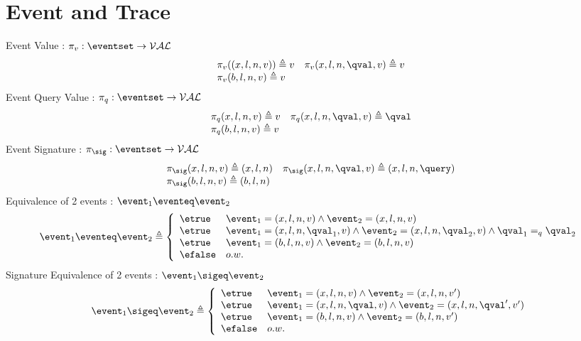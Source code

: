 \clearpage
%
\section{Event and Trace}
%
%
%
Event Value : $\pi_v : \eventset \to \mathcal{VAL}$
\[
\begin{array}{ll}
\pi_v((x, l, n, v)) \triangleq v
&
\pi_v (x, l, n, \qval, v) \triangleq v
\\
\pi_v (b, l, n, v)  \triangleq v
&
\end{array}
\]
%
Event Query Value : $\pi_{q} : \eventset \to \mathcal{VAL}$
\[
\begin{array}{ll}
\pi_{q} (x, l, n, v) \triangleq v
&
\pi_{q} (x, l, n, \qval, v) \triangleq \qval
\\
\pi_{q} (b, l, n, v)  \triangleq v
&
\end{array}
\]%
% 
Event Signature : $\pi_{\sig} : \eventset \to \mathcal{VAL}$
\[
\begin{array}{ll}
\pi_{\sig} (x, l, n, v) \triangleq (x, l, n)
&
\pi_{\sig} (x, l, n, \qval, v) \triangleq (x, l, n, \query)
\\
\pi_{\sig} (b, l, n, v)  \triangleq (b, l, n)
&
\end{array}
\]
%
Equivalence of 2 events : $\event_1 \eventeq \event_2$
\[
\event_1 \eventeq \event_2 \triangleq
\left\{
\begin{array}{ll}
\etrue & \event_1 = (x, l, n, v) \land \event_2 = (x, l, n, v) \\
\etrue & \event_1 = (x, l, n, \qval_1, v) \land \event_2 = (x, l, n, \qval_2, v)  
\land \qval_1 =_{q} \qval_2\\
\etrue & \event_1 = (b, l, n, v) \land \event_2 = (b, l, n, v) \\
\efalse & o.w.
\end{array}
\right.
\]
%
Signature Equivalence of 2 events : $\event_1 \sigeq \event_2$
\[
\event_1 \sigeq \event_2 \triangleq
\left\{
\begin{array}{ll}
\etrue & \event_1 = (x, l, n, v) \land \event_2 = (x, l, n, v') \\
\etrue & \event_1 = (x, l, n, \qval, v) \land \event_2 = (x, l, n, \qval', v') \\
\etrue & \event_1 = (b, l, n, v) \land \event_2 = (b, l, n, v') \\
\efalse & o.w.
\end{array}
\right.
\]
%
%
